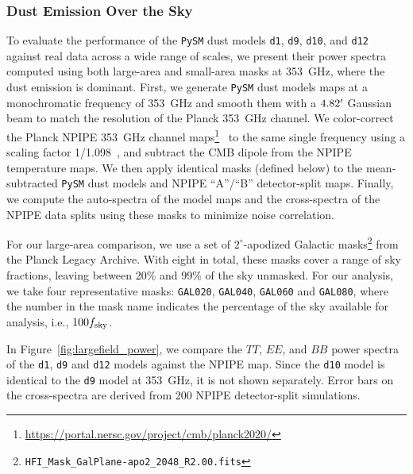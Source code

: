 \documentclass[twocolumn]{aastex631}
\begin{document}
\subsubsection{Dust Emission Over the Sky} 
\label{sec:dust_validation}
To evaluate the performance of the \texttt{PySM} dust models \texttt{d1}, \texttt{d9}, \texttt{d10}, and \texttt{d12} against real data across a wide range of scales, we present their power spectra computed using both large-area and small-area masks at 353~GHz, where the dust emission is dominant. First, we generate \texttt{PySM} dust models maps at a monochromatic frequency of 353~GHz and smooth them with a $4.82\mbox{$^\prime$}$ Gaussian beam to match the resolution of the Planck 353~GHz channel. We color-correct the Planck NPIPE 353~GHz channel maps\footnote{\url{https://portal.nersc.gov/project/cmb/planck2020/}}~\citep{PlanckCollaboration:2020} to the same single frequency using a scaling factor 1/1.098~\citep{planck2016-l11A}, and subtract the CMB dipole from the NPIPE temperature maps. We then apply identical masks (defined below) to the mean-subtracted \texttt{PySM} dust models and NPIPE ``A''/``B'' detector-split maps. Finally, we compute the auto-spectra of the model maps and the cross-spectra of the NPIPE data splits using these masks to minimize noise correlation. 

For our large-area comparison, we use a set of $2^\circ$-apodized Galactic masks\footnote{\texttt{HFI\_Mask\_GalPlane-apo2\_2048\_R2.00.fits}} from the Planck Legacy Archive. With eight in total, these masks cover a range of sky fractions, leaving between 20\% and 99\% of the sky unmasked. For our analysis, we take four representative masks: \texttt{GAL020}, \texttt{GAL040}, \texttt{GAL060} and \texttt{GAL080}, where the number in the mask name indicates the percentage of the sky available for analysis, i.e., $100 f_{\rm sky}$.

In Figure~\ref{fig:largefield_power}, we compare the $TT$, $EE$, and $BB$ power spectra of the \texttt{d1}, \texttt{d9} and \texttt{d12} models against the NPIPE map. Since the \texttt{d10} model is identical to the \texttt{d9} model at 353~GHz, it is not shown separately. Error bars on the cross-spectra are derived from 200 NPIPE detector-split simulations.
\end{document}
